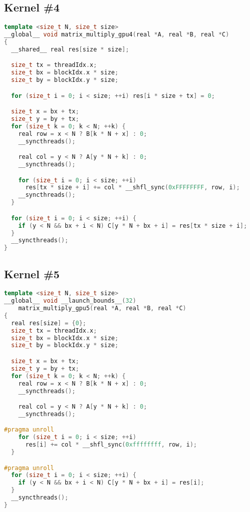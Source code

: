 \documentclass[12pt, a4paper]{article}
\begin{document}
\subsection*{Kernel \#4}
\begin{lstlisting}[language = C++]
template <size_t N, size_t size>
__global__ void matrix_multiply_gpu4(real *A, real *B, real *C)
{
  __shared__ real res[size * size];

  size_t tx = threadIdx.x;
  size_t bx = blockIdx.x * size;
  size_t by = blockIdx.y * size;

  for (size_t i = 0; i < size; ++i) res[i * size + tx] = 0;

  size_t x = bx + tx;
  size_t y = by + tx;
  for (size_t k = 0; k < N; ++k) {
    real row = x < N ? B[k * N + x] : 0;
    __syncthreads();

    real col = y < N ? A[y * N + k] : 0;
    __syncthreads();

    for (size_t i = 0; i < size; ++i)
      res[tx * size + i] += col * __shfl_sync(0xFFFFFFFF, row, i);
    __syncthreads();
  }

  for (size_t i = 0; i < size; ++i) {
    if (y < N && bx + i < N) C[y * N + bx + i] = res[tx * size + i];
  }
  __syncthreads();
}
\end{lstlisting}

\subsection*{Kernel \#5}
\begin{lstlisting}[language = C++]
template <size_t N, size_t size>
__global__ void __launch_bounds__(32)
    matrix_multiply_gpu5(real *A, real *B, real *C)
{
  real res[size] = {0};
  size_t tx = threadIdx.x;
  size_t bx = blockIdx.x * size;
  size_t by = blockIdx.y * size;

  size_t x = bx + tx;
  size_t y = by + tx;
  for (size_t k = 0; k < N; ++k) {
    real row = x < N ? B[k * N + x] : 0;
    __syncthreads();

    real col = y < N ? A[y * N + k] : 0;
    __syncthreads();

#pragma unroll
    for (size_t i = 0; i < size; ++i)
      res[i] += col * __shfl_sync(0xffffffff, row, i);
  }

#pragma unroll
  for (size_t i = 0; i < size; ++i) {
    if (y < N && bx + i < N) C[y * N + bx + i] = res[i];
  }
  __syncthreads();
}
\end{lstlisting}
\end{document}
